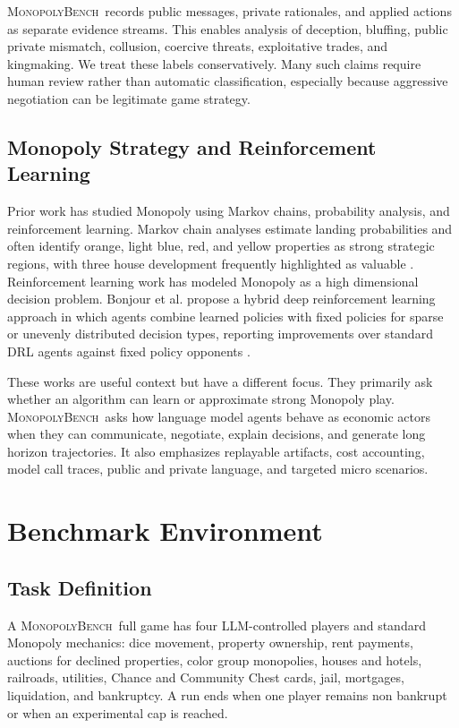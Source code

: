 \documentclass[conference]{IEEEtran}
\newcommand{\Bench}{\textsc{MonopolyBench}}
\begin{document}
\Bench\ records public messages, private rationales, and applied actions as separate evidence streams. This enables analysis of deception, bluffing, public private mismatch, collusion, coercive threats, exploitative trades, and kingmaking. We treat these labels conservatively. Many such claims require human review rather than automatic classification, especially because aggressive negotiation can be legitimate game strategy.

\subsection{Monopoly Strategy and Reinforcement Learning}

Prior work has studied Monopoly using Markov chains, probability analysis, and reinforcement learning. Markov chain analyses estimate landing probabilities and often identify orange, light blue, red, and yellow properties as strong strategic regions, with three house development frequently highlighted as valuable \cite{monopoly_markov}. Reinforcement learning work has modeled Monopoly as a high dimensional decision problem. Bonjour et al. propose a hybrid deep reinforcement learning approach in which agents combine learned policies with fixed policies for sparse or unevenly distributed decision types, reporting improvements over standard DRL agents against fixed policy opponents \cite{monopoly_drl}.

These works are useful context but have a different focus. They primarily ask whether an algorithm can learn or approximate strong Monopoly play. \Bench\ asks how language model agents behave as economic actors when they can communicate, negotiate, explain decisions, and generate long horizon trajectories. It also emphasizes replayable artifacts, cost accounting, model call traces, public and private language, and targeted micro scenarios.

\section{Benchmark Environment}
\label{sec:environment}

\subsection{Task Definition}

A \Bench\ full game has four LLM-controlled players and standard Monopoly mechanics: dice movement, property ownership, rent payments, auctions for declined properties, color group monopolies, houses and hotels, railroads, utilities, Chance and Community Chest cards, jail, mortgages, liquidation, and bankruptcy. A run ends when one player remains non bankrupt or when an experimental cap is reached.
\end{document}
